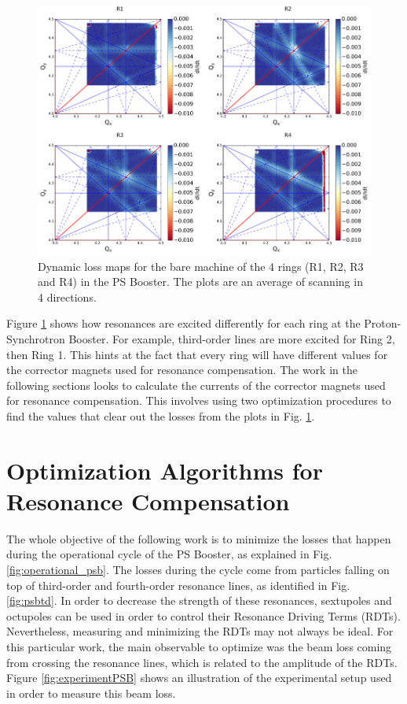 \begin{figure}[H]
    \centering
    \includegraphics[width=\columnwidth]{chapter5/bare.png}
    \caption{Dynamic loss maps for the bare machine of the 4 rings (R1, R2, R3 and R4) in the PS Booster. The plots are an average of scanning in 4 directions.}
    \label{fig:bare_psb}
\end{figure}

Figure \ref{fig:bare_psb} shows how resonances are excited differently for each ring at the Proton-Synchrotron Booster. For example, third-order lines are more excited for Ring 2, then Ring 1. This hints at the fact that every ring will have different values for the corrector magnets used for resonance compensation. The work in the following sections looks to calculate the currents of the corrector magnets used for resonance compensation. This involves using two optimization procedures to find the values that clear out the losses from the plots in Fig. \ref{fig:bare_psb}.

\section{Optimization Algorithms for Resonance Compensation}

The whole objective of the following work is to minimize the losses that happen during the operational cycle of the PS Booster, as explained in Fig. \ref{fig:operational_psb}. The losses during the cycle come from particles falling on top of third-order and fourth-order resonance lines, as identified in Fig. \ref{fig:psbtd}. In order to decrease the strength of these resonances, sextupoles and octupoles can be used in order to control their Resonance Driving Terms (RDTs). Nevertheless, measuring and minimizing the RDTs may not always be ideal. For this particular work, the main observable to optimize was the beam loss coming from crossing the resonance lines, which is related to the amplitude of the RDTs. Figure \ref{fig:experimentPSB} shows an illustration of the experimental setup used in order to measure this beam loss.

